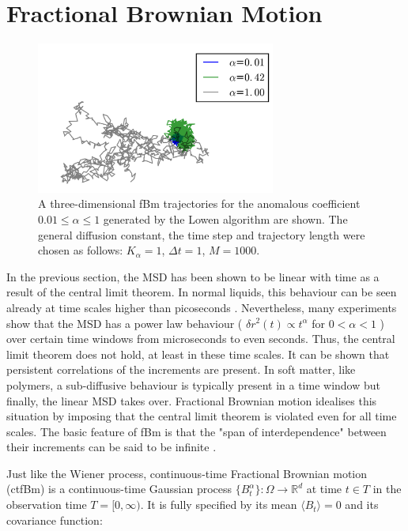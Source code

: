 \documentclass[
  a4paper,BCOR10mm,twoside,
  headsepline,footsepline,%
  fleqn,openbib
]{scrbook}
\begin{document}
\section{Fractional Brownian Motion}\label{sectionfrac}
\begin{figure}
\centering
\includegraphics[width=0.7\textwidth]{./data/trajectories_differentalpha1234.png}
\caption{A three-dimensional fBm trajectories for the anomalous coefficient $0.01\leq\alpha\leq 1$ generated by the Lowen algorithm are shown. The general diffusion constant, the time step and trajectory length were chosen as follows:  $K_{\alpha}=1$, $\Delta t=1$, $M=1000$.}
\label{alphachangetrajectory}
\end{figure}
In the previous section, the MSD has been shown to be linear with time as a result of the central limit theorem. In normal liquids, this behaviour can be seen already at time scales higher than picoseconds \cite{Hofling2013}. Nevertheless, many experiments show that the MSD has a power law behaviour ( $\delta r ^2 (t) \propto t^{\alpha}$ for  $0 < \alpha < 1$ ) over certain time windows from  microseconds to even seconds. Thus, the central limit theorem does not hold, at least in these time scales. It can be shown that persistent correlations of the increments are present. In soft matter, like polymers, a sub-diffusive behaviour is typically present in a time window but finally, the linear MSD takes over. Fractional Brownian motion idealises this situation by imposing that the central limit theorem is violated even for all time scales. The basic feature of fBm is that the "span of interdependence" between their increments can be said to be infinite \cite{Mandelbrot1968}. \par
Just like the Wiener process, continuous-time Fractional Brownian motion (ctfBm) is a continuous-time Gaussian process $\{B^{\alpha}_t\}: \Omega \rightarrow \mathbb{R}^d$ at time $t \in T$ in the observation time $T =[0, \infty)$. It is fully specified by its mean $\langle B_t \rangle=0$ and its covariance function:
\end{document}

